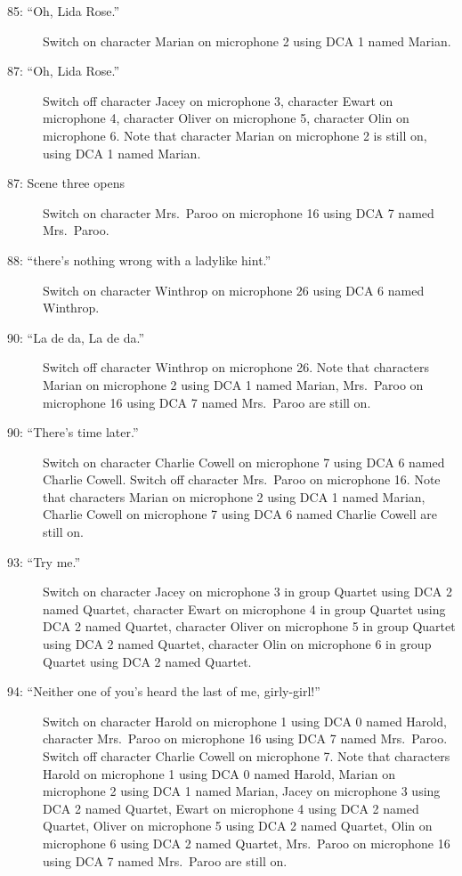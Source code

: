 \begin{description}
\item[85: ``Oh, Lida Rose.'']
Switch on character Marian on microphone 2 using DCA 1 named Marian. 

\item[87: ``Oh, Lida Rose.'']
Switch off character Jacey on microphone 3, character Ewart on microphone 4, character Oliver on microphone 5, character Olin on microphone 6. Note that character Marian on microphone 2 is still on, using DCA 1 named Marian.

\item[87: Scene three opens]
Switch on character Mrs.~Paroo on microphone 16 using DCA 7 named Mrs.~Paroo. 

\item[88: ``there's nothing wrong with a ladylike hint.'']
Switch on character Winthrop on microphone 26 using DCA 6 named Winthrop. 

\item[90: ``La de da, La de da.'']
Switch off character Winthrop on microphone 26. Note that characters Marian on microphone 2 using DCA 1 named Marian, Mrs.~Paroo on microphone 16 using DCA 7 named Mrs.~Paroo are still on.  

\item[90: ``There's time later.'']
Switch on character Charlie Cowell on microphone 7 using DCA 6 named Charlie Cowell. Switch off character Mrs.~Paroo on microphone 16. Note that characters Marian on microphone 2 using DCA 1 named Marian, Charlie Cowell on microphone 7 using DCA 6 named Charlie Cowell are still on.  

\item[93: ``Try me.'']
Switch on character Jacey on microphone 3 in group Quartet using DCA 2 named Quartet, character Ewart on microphone 4 in group Quartet using DCA 2 named Quartet, character Oliver on microphone 5 in group Quartet using DCA 2 named Quartet, character Olin on microphone 6 in group Quartet using DCA 2 named Quartet. 

\item[94: ``Neither one of you's heard the last of me, girly-girl!'']
Switch on character Harold on microphone 1 using DCA 0 named Harold, character Mrs.~Paroo on microphone 16 using DCA 7 named Mrs.~Paroo. Switch off character Charlie Cowell on microphone 7. Note that characters Harold on microphone 1 using DCA 0 named Harold, Marian on microphone 2 using DCA 1 named Marian, Jacey on microphone 3 using DCA 2 named Quartet, Ewart on microphone 4 using DCA 2 named Quartet, Oliver on microphone 5 using DCA 2 named Quartet, Olin on microphone 6 using DCA 2 named Quartet, Mrs.~Paroo on microphone 16 using DCA 7 named Mrs.~Paroo are still on.  


\end{description}
